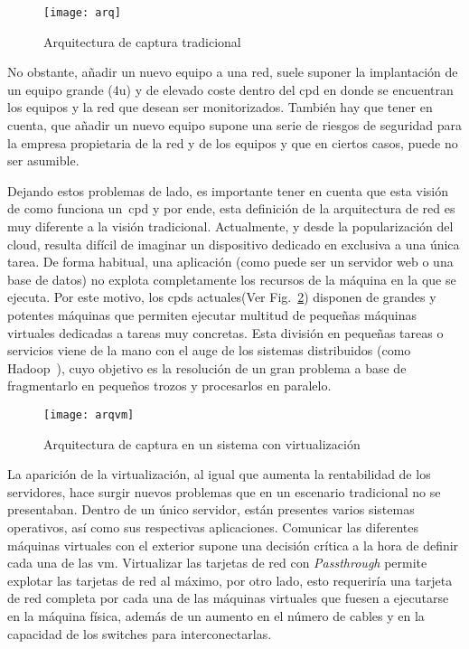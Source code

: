 
\begin{figure}[!th]
\centering
\texttt{[image: arq]}
\caption{Arquitectura de captura tradicional}
\label{fig:dis:arq}
\end{figure}

No obstante, añadir un nuevo equipo a una red, suele suponer la implantación de un equipo grande (4\gls{u}) y de elevado coste dentro del \gls{cpd} en donde se encuentran los equipos y la red que desean ser monitorizados. También hay que tener en cuenta, que añadir un nuevo equipo supone una serie de riesgos de seguridad para la empresa propietaria de la red y de los equipos y que en ciertos casos, puede no ser asumible.

Dejando estos problemas de lado, es importante tener en cuenta que esta visión de como funciona un~\gls{cpd} y por ende, esta definición de la arquitectura de red es muy diferente a la visión tradicional. Actualmente, y desde la popularización del \gls{cloud}, resulta difícil de imaginar un dispositivo dedicado en exclusiva a una única tarea. De forma habitual, una aplicación (como puede ser un servidor web o una base de datos) no explota completamente los recursos de la máquina en la que se ejecuta. Por este motivo, los \glspl{cpd} actuales(Ver Fig.~\ref{fig:dis:arqvm}) disponen de grandes y potentes máquinas que permiten ejecutar multitud de pequeñas máquinas virtuales dedicadas a tareas muy concretas. Esta división en pequeñas tareas o servicios viene de la mano con el auge de los sistemas distribuidos (como Hadoop~\cite{hadoop,hadoop-definitive-guide}), cuyo objetivo es la resolución de un gran problema a base de fragmentarlo en pequeños trozos y procesarlos en paralelo.


\begin{figure}[!th]
\centering
\texttt{[image: arqvm]}
\caption{Arquitectura de captura en un sistema con virtualización}
\label{fig:dis:arqvm}
\end{figure}

La aparición de la virtualización, al igual que aumenta la rentabilidad de los servidores, hace surgir nuevos problemas que en un escenario tradicional no se presentaban. Dentro de un único servidor, están presentes varios sistemas operativos, así como sus respectivas aplicaciones. Comunicar las diferentes máquinas virtuales con el exterior supone una decisión crítica a la hora de definir cada una de las \gls{vm}.
Virtualizar las tarjetas de red con \textit{Passthrough} permite explotar las tarjetas de red al máximo, por otro lado, esto requeriría una tarjeta de red completa por cada una de las máquinas virtuales que fuesen a ejecutarse en la máquina física, además de un aumento en el número de cables y en la capacidad de los switches para interconectarlas.

